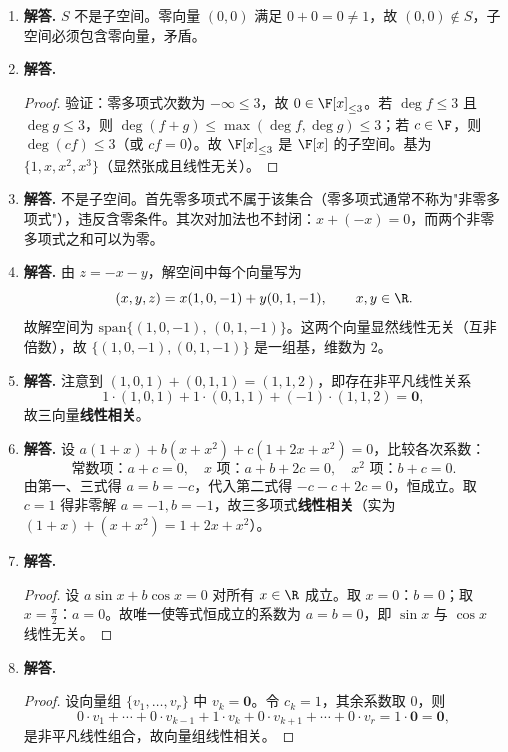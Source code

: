 \begin{enumerate}[label=\textbf{\arabic*.}, leftmargin=*, itemsep=1em]
\item \textbf{解答.}
$S$ 不是子空间。零向量 $(0,0)$ 满足 $0+0=0\ne 1$，故 $(0,0)\notin S$，子空间必须包含零向量，矛盾。

\item \textbf{解答.}
\begin{proof}
验证：零多项式次数为 $-\infty\le 3$，故 $0\in\F[x]_{\le 3}$。若 $\deg f\le 3$ 且 $\deg g\le 3$，则 $\deg(f+g)\le\max(\deg f,\deg g)\le 3$；若 $c\in\F$，则 $\deg(cf)\le 3$（或 $cf=0$）。故 $\F[x]_{\le 3}$ 是 $\F[x]$ 的子空间。基为 $\{1,x,x^2,x^3\}$（显然张成且线性无关）。
\end{proof}

\item \textbf{解答.}
不是子空间。首先零多项式不属于该集合（零多项式通常不称为"非零多项式"），违反含零条件。其次对加法也不封闭：$x+(-x)=0$，而两个非零多项式之和可以为零。

\item \textbf{解答.}
由 $z=-x-y$，解空间中每个向量写为
\[
(x,y,z)=x(1,0,-1)+y(0,1,-1),\qquad x,y\in\R.
\]
故解空间为 $\mathrm{span}\{(1,0,-1),\,(0,1,-1)\}$。这两个向量显然线性无关（互非倍数），故 $\{(1,0,-1),(0,1,-1)\}$ 是一组基，维数为 $2$。

\item \textbf{解答.}
注意到 $(1,0,1)+(0,1,1)=(1,1,2)$，即存在非平凡线性关系
\[
1\cdot(1,0,1)+1\cdot(0,1,1)+(-1)\cdot(1,1,2)=\mathbf{0},
\]
故三向量\textbf{线性相关}。

\item \textbf{解答.}
设 $a(1+x)+b(x+x^2)+c(1+2x+x^2)=0$，比较各次系数：
\[
\text{常数项：}a+c=0,\quad
x\text{ 项：}a+b+2c=0,\quad
x^2\text{ 项：}b+c=0.
\]
由第一、三式得 $a=b=-c$，代入第二式得 $-c-c+2c=0$，恒成立。取 $c=1$ 得非零解 $a=-1,b=-1$，故三多项式\textbf{线性相关}（实为 $(1+x)+(x+x^2)=1+2x+x^2$）。

\item \textbf{解答.}
\begin{proof}
设 $a\sin x+b\cos x=0$ 对所有 $x\in\R$ 成立。取 $x=0$：$b=0$；取 $x=\tfrac{\pi}{2}$：$a=0$。故唯一使等式恒成立的系数为 $a=b=0$，即 $\sin x$ 与 $\cos x$ 线性无关。
\end{proof}

\item \textbf{解答.}
\begin{proof}
设向量组 $\{v_1,\dots,v_r\}$ 中 $v_k=\mathbf{0}$。令 $c_k=1$，其余系数取 $0$，则
\[
0\cdot v_1+\cdots+0\cdot v_{k-1}+1\cdot v_k+0\cdot v_{k+1}+\cdots+0\cdot v_r=1\cdot\mathbf{0}=\mathbf{0},
\]
是非平凡线性组合，故向量组线性相关。
\end{proof}


\end{enumerate}
